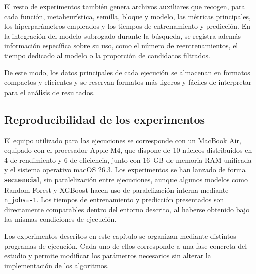 El resto de experimentos también genera archivos auxiliares que recogen, para cada función, metaheurística, semilla, bloque y
modelo, las métricas principales, los hiperparámetros empleados y
los tiempos de entrenamiento y predicción. En la integración del modelo subrogado durante la búsqueda, se registra además información específica sobre su uso, como el número de reentrenamientos, el tiempo dedicado al modelo o la proporción de candidatos filtrados.

De este modo, los datos principales de cada ejecución se almacenan en formatos compactos y eficientes y se reservan formatos más ligeros y fáciles de interpretar para el análisis de resultados.

\subsection{Reproducibilidad de los experimentos}

El equipo utilizado para las ejecuciones se corresponde con un MacBook Air, equipado con el procesador Apple M4, que dispone de 10 núcleos distribuidos en 4 de rendimiento y 6 de eficiencia, junto con 16~GB de memoria RAM unificada y el sistema operativo macOS 26.3. Los experimentos se han lanzado de forma \textbf{secuencial}, sin paralelización entre ejecuciones, aunque algunos modelos como Random Forest y XGBoost hacen uso de paralelización interna mediante \texttt{n\_jobs=-1}. Los tiempos de entrenamiento y predicción presentados son directamente comparables dentro del entorno descrito, al haberse obtenido bajo las mismas condiciones de ejecución.

Los experimentos descritos en este capítulo se organizan mediante distintos
programas de ejecución. Cada uno de ellos corresponde a una fase concreta del
estudio y permite modificar los parámetros necesarios sin alterar la
implementación de los algoritmos.

